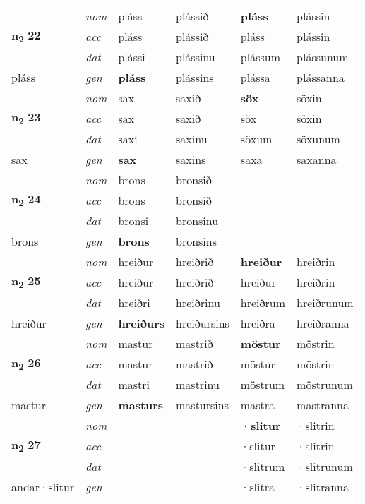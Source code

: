 \begin{longtable}[l]{X>{\footnotesize\itshape}XXXXX}
\multirow{3}{*}{{{\textbf{n{\textsubscript{2}}} \Large{\textbf{22}}}}} & nom & pláss & plássið & \textbf{pláss} & plássin \\*
 & acc & pláss & plássið & pláss & plássin \\*
 & dat & plássi & plássinu & plássum & plássunum \\*
 {\footnotesize{pláss}} & gen & \textbf{pláss} & plássins & plássa & plássanna \\
\midrule

\multirow{3}{*}{{{\textbf{n{\textsubscript{2}}} \Large{\textbf{23}}}}} & nom & sax & saxið & \textbf{söx} & söxin \\*
 & acc & sax & saxið & söx & söxin \\*
 & dat & saxi & saxinu & söxum & söxunum \\*
 {\footnotesize{sax}} & gen & \textbf{sax} & saxins & saxa & saxanna \\
\midrule

\multirow{3}{*}{{{\textbf{n{\textsubscript{2}}} \Large{\textbf{24}}}}} & nom & brons & bronsið & \textbf{} &  \\*
 & acc & brons & bronsið &  &  \\*
 & dat & bronsi & bronsinu &  &  \\*
 {\footnotesize{brons}} & gen & \textbf{brons} & bronsins &  &  \\
\midrule

\multirow{3}{*}{{{\textbf{n{\textsubscript{2}}} \Large{\textbf{25}}}}} & nom & hreiður & hreiðrið & \textbf{hreiður} & hreiðrin \\*
 & acc & hreiður & hreiðrið & hreiður & hreiðrin \\*
 & dat & hreiðri & hreiðrinu & hreiðrum & hreiðrunum \\*
 {\footnotesize{hreiður}} & gen & \textbf{hreiðurs} & hreiðursins & hreiðra & hreiðranna \\
\midrule

\multirow{3}{*}{{{\textbf{n{\textsubscript{2}}} \Large{\textbf{26}}}}} & nom & mastur & mastrið & \textbf{möstur} & möstrin \\*
 & acc & mastur & mastrið & möstur & möstrin \\*
 & dat & mastri & mastrinu & möstrum & möstrunum \\*
 {\footnotesize{mastur}} & gen & \textbf{masturs} & mastursins & mastra & mastranna \\
\midrule

\multirow{3}{*}{{{\textbf{n{\textsubscript{2}}} \Large{\textbf{27}}}}} & nom &  &  & \textbf{·slitur} & ·slitrin \\*
 & acc &  &  & ·slitur & ·slitrin \\*
 & dat &  &  & ·slitrum & ·slitrunum \\*
 {\footnotesize{andar\allowbreak ·slitur}} & gen & \textbf{} &  & ·slitra & ·slitranna \\
\midrule


\end{longtable}

